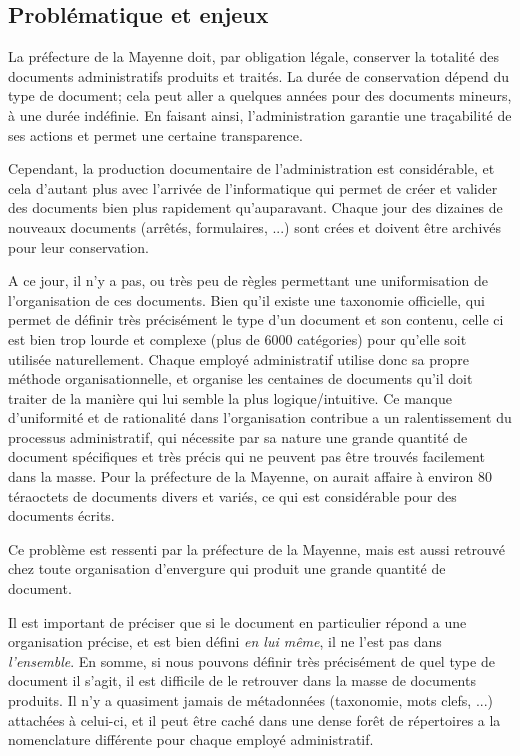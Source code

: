 \subsection{Problématique et enjeux}

La préfecture de la Mayenne doit, par obligation légale, conserver la totalité des documents administratifs produits et traités.
La durée de conservation dépend du type de document; cela peut aller a quelques années pour des documents mineurs, à une durée indéfinie.
En faisant ainsi, l'administration garantie une traçabilité de ses actions et permet une certaine transparence. 

Cependant, la production documentaire de l'administration est considérable, et cela d'autant plus avec l'arrivée de l'informatique qui permet de créer et valider des documents bien plus rapidement qu'auparavant.
Chaque jour des dizaines de nouveaux documents (arrêtés, formulaires, ...) sont crées et doivent être archivés pour leur conservation.

A ce jour, il n'y a pas, ou très peu de règles permettant une uniformisation de l'organisation de ces documents.
Bien qu'il existe une taxonomie officielle, qui permet de définir très précisément le type d'un document et son contenu, celle ci est bien trop lourde et complexe (plus de 6000 catégories) pour qu'elle soit utilisée naturellement.
Chaque employé administratif utilise donc sa propre méthode organisationnelle, et organise les centaines de documents qu'il doit traiter de la manière qui lui semble la plus logique/intuitive.
Ce manque d'uniformité et de rationalité dans l'organisation contribue a un ralentissement du processus administratif, qui nécessite par sa nature une grande quantité de document spécifiques et très précis qui ne peuvent pas être trouvés facilement dans la masse.
Pour la préfecture de la Mayenne, on aurait affaire à environ 80 téraoctets de documents divers et variés, ce qui est considérable pour des documents écrits. 

Ce problème est ressenti par la préfecture de la Mayenne, mais est aussi retrouvé chez toute organisation d'envergure qui produit une grande quantité de document. 

Il est important de préciser que si le document en particulier répond a une organisation précise, et est bien défini \textit{en lui même}, il ne l'est pas dans \textit{l'ensemble}.
En somme, si nous pouvons définir très précisément de quel type de document il s'agit, il est difficile de le retrouver dans la masse de documents produits.
Il n'y a quasiment jamais de métadonnées (taxonomie, mots clefs, ...) attachées à celui-ci, et il peut être caché dans une dense forêt de répertoires a la nomenclature différente pour chaque employé administratif.

